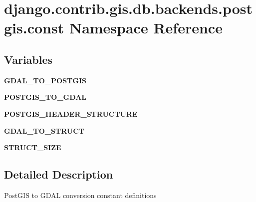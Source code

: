 \hypertarget{namespacedjango_1_1contrib_1_1gis_1_1db_1_1backends_1_1postgis_1_1const}{}\section{django.\+contrib.\+gis.\+db.\+backends.\+postgis.\+const Namespace Reference}
\label{namespacedjango_1_1contrib_1_1gis_1_1db_1_1backends_1_1postgis_1_1const}
\subsection*{Variables}
\begin{DoxyCompactItemize}
\item 
\mbox{\label{namespacedjango_1_1contrib_1_1gis_1_1db_1_1backends_1_1postgis_1_1const_af6eedf6e983a0fb5ad4017f09c86e26f}} 
{\bfseries G\+D\+A\+L\+\_\+\+T\+O\+\_\+\+P\+O\+S\+T\+G\+IS}
\item 
\mbox{\label{namespacedjango_1_1contrib_1_1gis_1_1db_1_1backends_1_1postgis_1_1const_a0fe36f98bce695e1d67d8c74d33bdf6a}} 
{\bfseries P\+O\+S\+T\+G\+I\+S\+\_\+\+T\+O\+\_\+\+G\+D\+AL}
\item 
\mbox{\label{namespacedjango_1_1contrib_1_1gis_1_1db_1_1backends_1_1postgis_1_1const_afd7ca900300608bbad0d061d01f58d26}} 
{\bfseries P\+O\+S\+T\+G\+I\+S\+\_\+\+H\+E\+A\+D\+E\+R\+\_\+\+S\+T\+R\+U\+C\+T\+U\+RE}
\item 
\mbox{\label{namespacedjango_1_1contrib_1_1gis_1_1db_1_1backends_1_1postgis_1_1const_aee8c458fd113805b60daddb525aef63c}} 
{\bfseries G\+D\+A\+L\+\_\+\+T\+O\+\_\+\+S\+T\+R\+U\+CT}
\item 
\mbox{\label{namespacedjango_1_1contrib_1_1gis_1_1db_1_1backends_1_1postgis_1_1const_a7fa37dcf5d3434afe6bfc6f682f66553}} 
{\bfseries S\+T\+R\+U\+C\+T\+\_\+\+S\+I\+ZE}
\end{DoxyCompactItemize}


\subsection{Detailed Description}
\begin{DoxyVerb}PostGIS to GDAL conversion constant definitions
\end{DoxyVerb}
 